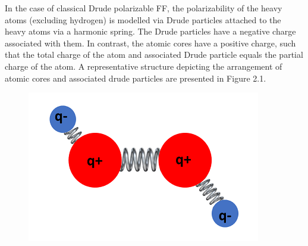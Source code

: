 In the case of classical Drude polarizable FF, the polarizability of the heavy atoms (excluding hydrogen) is modelled via Drude particles attached to the heavy atoms via a harmonic spring. The Drude particles have a negative charge associated with them. In contrast, the atomic cores have a positive charge, such that the total charge of the atom and associated Drude particle equals the partial charge of the atom. A representative structure depicting the arrangement of atomic cores and associated drude particles are presented in Figure 2.1. 
\begin{figure}
    \centering
    \includegraphics{Methods/Figures/drude.png}
\end{figure}

